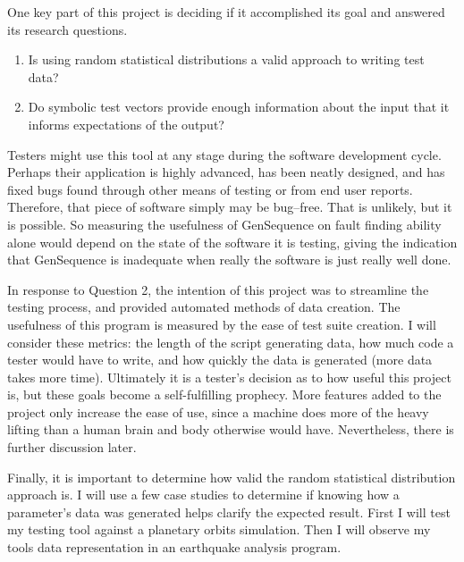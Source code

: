 
One key part of this project is deciding if it accomplished its goal and answered its research questions. 
\begin{enumerate}
\item Is using random statistical distributions a valid approach to writing test data?
\item Do symbolic test vectors provide enough information about the input that it informs expectations of the output?
\end{enumerate}

Testers might use this tool at any stage during the software development cycle. Perhaps their application is highly advanced, has been neatly designed, and has fixed bugs found through other means of testing or from end user reports. Therefore, that piece of software simply may be bug--free. That is unlikely, but it is possible. So measuring the usefulness of GenSequence on fault finding ability alone would depend on the state of the software it is testing, giving the indication that GenSequence is inadequate when really the software is just really well done.

In response to Question 2, the intention of this project was to streamline the testing process, and provided automated methods of data creation. The usefulness of this program is measured by the ease of test suite creation. I will consider these metrics: the length of the script generating data, how much code a tester would have to write, and how quickly the data is generated (more data takes more time). Ultimately it is a tester's decision as to how useful this project is, but these goals become a self-fulfilling prophecy. More features added to the project only increase the ease of use, since a machine does more of the heavy lifting than a human brain and body otherwise would have. Nevertheless, there is further discussion later.

Finally, it is important to determine how valid the random statistical distribution approach is. I will use a few case studies to determine if knowing how a parameter’s data was generated helps clarify the expected result. First I will test my testing tool against a planetary orbits simulation. Then I will observe my tools data representation in an earthquake analysis program. 